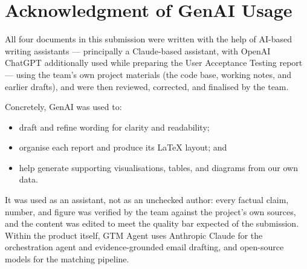 \documentclass[fontsize=11pt,twoside=off]{scrbook}
\begin{document}
\cleardoublepage


\cleardoublepage
\chapter*{Acknowledgment of GenAI Usage}

All four documents in this submission were written with the help of AI-based writing
assistants --- principally a Claude-based assistant, with OpenAI ChatGPT additionally
used while preparing the User Acceptance Testing report --- using the team's own
project materials (the code base, working notes, and earlier drafts), and were then
reviewed, corrected, and finalised by the team.

Concretely, GenAI was used to:
\begin{itemize}
\item draft and refine wording for clarity and readability;
\item organise each report and produce its LaTeX layout; and
\item help generate supporting visualisations, tables, and diagrams from our own data.
\end{itemize}

It was used as an assistant, not as an unchecked author: every factual claim, number,
and figure was verified by the team against the project's own sources, and the content
was edited to meet the quality bar expected of the submission. Within the product
itself, GTM Agent uses Anthropic Claude for the orchestration agent and
evidence-grounded email drafting, and open-source models for the matching pipeline.
\end{document}
